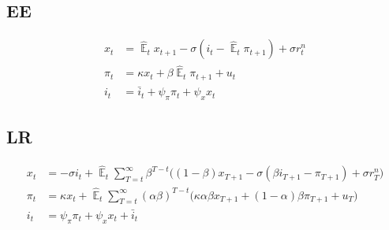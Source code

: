 \documentclass[11pt]{article}
\renewcommand{\[}{\begin{equation}}
\renewcommand{\]}{\end{equation}}
\DeclareMathOperator{\E}{\mathbb{E}}
\begin{document}
\subsection{EE}
\begin{align}
x_t &= \hat{\E}_t x_{t+1} - \sigma(i_t - \hat{\E}_t \pi_{t+1}) +\sigma r_t^n \tag{Preston, eq. (13)} \label{prestons13} \\
\pi_t &= \kappa x_t +\beta \hat{\E}_t \pi_{t+1} + u_t \tag{Preston, eq. (14)} \label{prestons14}  \\
i_t &= \bar{i}_t + \psi_{\pi}\pi_t + \psi_{x} x_t \tag{Preston, eq. (27) } 
\end{align}
\subsection{LR}
\begin{align}
x_t &=  -\sigma i_t +\hat{\E}_t \sum_{T=t}^{\infty} \beta^{T-t }\big( (1-\beta)x_{T+1} - \sigma(\beta i_{T+1} - \pi_{T+1}) +\sigma r_T^n \big) \tag{Preston, eq. (18)} \label{prestons18}  \\
\pi_t &= \kappa x_t +\hat{\E}_t \sum_{T=t}^{\infty} (\alpha\beta)^{T-t }\big( \kappa \alpha \beta x_{T+1} + (1-\alpha)\beta \pi_{T+1} + u_T\big)\tag{Preston, eq. (19)} \label{prestons19}  \\
i_t &= \psi_{\pi}\pi_t + \psi_{x} x_t + \bar{i}_t \tag{Preston, eq. (27)} 
\end{align}
\end{document}
